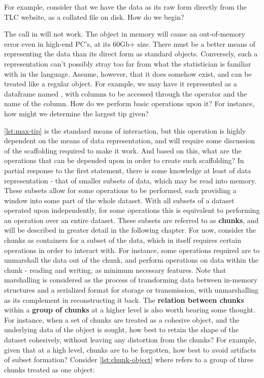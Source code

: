 For example, consider that we have the data as its raw form directly from the TLC website, as a collated  file on disk.
How do we begin?


The call in  will not work.
The object in memory will cause an out-of-memory error even in high-end PC's, at its 60Gb+ size.
There must be a better means of representing the data than its direct form as standard \R{} objects.
Conversely, such a representation can't possibly stray too far from what the statistician is familiar with in the language.
Assume, however, that it does somehow exist, and can be treated like a regular object.
For example, we may have it represented as a dataframe named , with columns to be accessed through the  operator and the name of the column.
How do we perform basic operations upon it?
For instance, how might we determine the largest tip given?


\cref{lst:max-tip} is the standard means of interaction, but this operation is highly
dependent on the means of data representation, and will require some
discussion of the scaffolding required to make it work.
And based on this, what are the operations that can be depended upon in order to create such scaffolding?
In partial response to the first statement, there is some knowledge at least of data representation - that of smaller subsets of data, which may be read into memory.
These subsets allow for some operations to be performed, each providing a window into some part of the whole dataset.
With all subsets of a dataset operated upon independently, for some operations this is equivalent to performing an operation over an entire dataset.
These subsets are referred to as \textbf{chunks}, and will be described in greater detail in the following chapter.
For now, consider the chunks as containers for a subset of the data, which in itself requires certain operations in order to interact with.
For instance, some operations required are to unmarshall the data out of the chunk, and perform operations on data within the chunk - reading and writing, as minimum necessary features.
Note that marshalling is considered as the process of transforming data between in-memory structures and a serialized format for storage or transmission, with unmarshalling as its complement in reconstructing it back.
The \textbf{relation between chunks} within a \textbf{group of chunks} at a higher level is also worth bearing some thought.
For instance, when a set of chunks are treated as a cohesive object, and the underlying data of the object is sought, how best to retain the shape of the dataset cohesively, without leaving any distortion from the chunks?
For example, given that at a high level, chunks are to be forgotten, how best to avoid artifacts of subset formation?
Consider \cref{lst:chunk-object} where  refers to a group of three chunks treated as one object:

